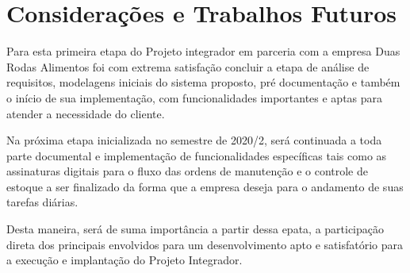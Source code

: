 \chapter{Considerações e Trabalhos Futuros}


Para esta primeira etapa do Projeto integrador em parceria com a empresa Duas Rodas Alimentos foi com extrema satisfação concluir a etapa de análise de requisitos, modelagens iniciais  do sistema proposto, pré documentação e também o início de sua implementação, com funcionalidades importantes e aptas para atender a necessidade do cliente.

Na próxima etapa inicializada no semestre de 2020/2, será continuada a toda parte documental e implementação  de funcionalidades específicas tais como  as assinaturas digitais para o fluxo das ordens de manutenção e o controle de estoque a ser finalizado da forma que a empresa deseja para o andamento de suas tarefas diárias.

Desta maneira, será de suma importância  a partir dessa epata, a participação direta dos principais envolvidos para um desenvolvimento apto e satisfatório para a execução e implantação do Projeto Integrador.

